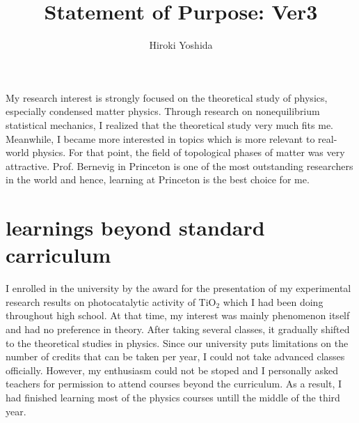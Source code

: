 \documentclass[a4]{article}
\title{Statement of Purpose: Ver3}
\author{Hiroki Yoshida}
\date{}
\begin{document}
\maketitle

My research interest is strongly focused on the theoretical study of physics, especially condensed matter physics. Through research on nonequilibrium statistical mechanics, I realized that the theoretical study very much fits me. Meanwhile, I became more interested in topics which is more relevant to real-world physics. For that point, the field of topological phases of matter was very attractive. Prof. Bernevig in Princeton is one of the most outstanding researchers in the world and hence, learning at Princeton is the best choice for me.\par

\section{learnings beyond standard carriculum}
I enrolled in the university by the award for the presentation of my experimental research results on photocatalytic activity of TiO$_2$ which I had been doing throughout high school. At that time, my interest was mainly phenomenon itself and had no preference in theory. After taking several classes, it gradually shifted to the theoretical studies in physics. Since our university puts limitations on the number of credits that can be taken per year, I could not take advanced classes officially. However, my enthusiasm could not be stoped and I personally asked teachers for permission to attend courses beyond the curriculum. As a result, I had finished learning most of the physics courses untill the middle of the third year.\par
\end{document}
